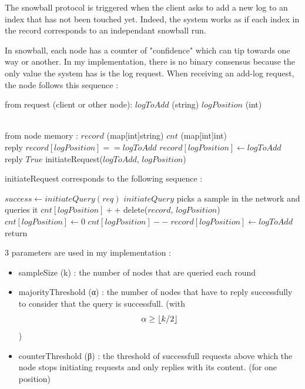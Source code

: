 \documentclass[11pt, twocolumn]{article}
\DeclarePairedDelimiter\floor{\lfloor}{\rfloor}
\begin{document}
The snowball protocol is triggered when the client asks to add a new log to an index that has not been touched yet. Indeed, the system works as if each index in the record corresponds to an independant snowball run.

In snowball, each node has a counter of "confidence" which can tip towards one way or another. In my implementation, there is no binary consensus because the only value the system has is the log request.
When receiving an add-log request, the node follows this sequence :
\begin{algorithmic}
    \State from request (client or other node):
    \State $logToAdd$ (string)
    \State $logPosition$ (int)

    \State \\from node memory :
    \State $record$ (map[int]string)
    \State $cnt$ (map[int]int)
    \\
    \State reply $record[logPosition] == logToAdd$
    \Else
    \State $record[logPosition] \gets logToAdd$
    \State reply $True$
    \State initiateRequest($logToAdd$, $logPosition$)
    \EndIf

\end{algorithmic}

initiateRequest corresponds to the following sequence :

\begin{algorithmic}
    \State $success \gets initiateQuery(req)$
    \State $initiateQuery$ picks a sample in the network and queries it
    \State $cnt[logPosition]++$
    \Else
    \State delete($record$, $logPosition$)
    \State $cnt[logPosition] \gets 0$
    \Else
    \State $cnt[logPosition]--$
    \EndIf
    \EndIf
    \State $record[logPosition] \gets logToAdd$
    \State return
    \EndIf
    \EndWhile
\end{algorithmic}

3 parameters are used in my implementation :
\begin{itemize}
    \item sampleSize (k) : the number of nodes that are queried each round
    \item majorityThreshold (α) : the number of nodes that have to reply successfully to consider that the query is successfull.
          (with \begin{equation*} \alpha \geq \floor{k/2}  \end{equation*})
    \item counterThreshold (β) : the threshold of successfull requests above which the node stops initiating requests and only replies with its content. (for one position)
\end{itemize}
\end{document}
